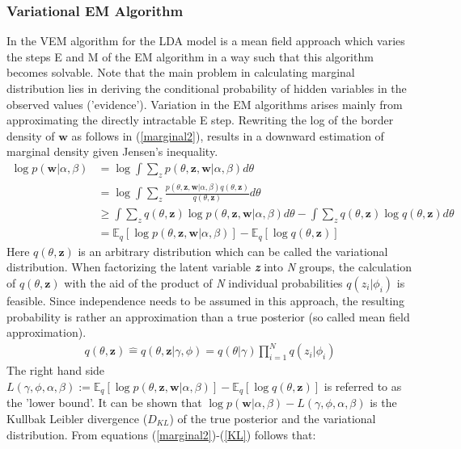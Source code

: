 \documentclass[11pt,a4paper]{article}
\begin{document}
\subsubsection{Variational EM Algorithm}

In the VEM algorithm for the LDA model is a mean field approach which varies the steps E and M of the EM algorithm in a way such that this algorithm becomes solvable. Note that the main problem in calculating marginal distribution lies in deriving the conditional probability of hidden variables in the observed values ('evidence'). Variation in the EM algorithms arises mainly from approximating the directly intractable E step.  Rewriting the log of the border density of $\textbf{w}$ as follows in (\ref{marginal2}), results in a downward estimation of marginal density given Jensen's inequality.
\begin{align}\label{marginal2}
\log p(\textbf{w}|\alpha, \beta) &= \log \int \sum_{z} 
p(\theta,\textbf{z},\textbf{w}|\alpha,\beta)d\theta\\
& =\log \int \sum_{z} \frac{p(\theta,\textbf{z},\textbf{w}|\alpha,\beta) q(\theta,\textbf{z})}{q(\theta,\textbf{z})}d\theta\\
&\geq \int \sum_{z} q(\theta,\textbf{z})\log p(\theta,\textbf{z},\textbf{w}|\alpha,\beta) d\theta - 
\int \sum_{z} q(\theta,\textbf{z})\log q(\theta,\textbf{z})d\theta\\
&= \mathbb{E}_q[\log p(\theta,\textbf{z},\textbf{w}|\alpha,\beta) ]-
\mathbb{E}_q[\log q(\theta,\textbf{z})] \label{KL}
\end{align}
Here $q(\theta,\textbf{z})$ is an arbitrary distribution which can be called the variational distribution. When factorizing the latent variable \textit{\textbf{z}} into \textit{N} groups, the calculation of $q(\theta,\textbf{z})$ with the aid of the product of \textit{N} individual probabilities $q(z_i|\phi_i)$ is feasible. Since independence needs to be assumed in this approach, the resulting probability is rather an approximation than a true posterior (so called mean field approximation).
\begin{align}
q(\theta,\textbf{z})\widehat{=}q(\theta,\textbf{z}|\gamma,\phi)
=q(\theta|\gamma) \prod_{i=1}^N q(z_i|\phi_i)
\end{align}
The right hand side $L(\gamma,\phi,\alpha, \beta):=\mathbb{E}_q[\log p(\theta,\textbf{z},\textbf{w}|\alpha,\beta) ]-
\mathbb{E}_q[\log q(\theta,\textbf{z})]$ is referred to as the 'lower bound'. It can be shown that $\log p(\textbf{w}|\alpha, \beta) - L(\gamma,\phi,\alpha, \beta)$ is the Kullbak Leibler divergence ($D_{KL}$) of the true posterior and the variational distribution. From equations (\ref{marginal2})-(\ref{KL}) follows that:
\end{document}
